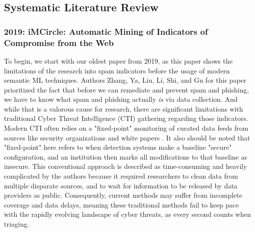 \documentclass[conference]{IEEEtran}
\begin{document}
\subsection{Systematic Literature Review}

\subsubsection{2019: iMCircle: Automatic Mining of Indicators of Compromise from the Web} %
To begin, we start with our oldest paper from 2019, as this paper shows the limitations of the research into spam indicators before the usage of modern semantic ML techniques.
Authors Zhang, Ya, Liu, Li, Shi, and Gu for this paper prioritized the fact that before we can remediate and prevent spam and phishing, we have to know what spam and phishing actually \textit{is} via data collection.
And while that is a valorous cause for research, there are significant limitations with traditional Cyber Threat Intelligence (CTI) gathering regarding those indicators.
Modern CTI often relies on a "fixed-point" monitoring of curated data feeds from sources like security organizations and white papers \cite{zhang1}.
It also should be noted that "fixed-point" here refers to when detection systems make a baseline "secure" configuration, and an institution then marks all modifications to that baseline as insecure.
This conventional approach is described as time-consuming and heavily complicated by the authors because it required researchers to clean data from multiple disparate sources, and to wait for information to be released by data providers as public.
Consequently, current methods may suffer from incomplete coverage and data delays, meaning these traditional methods fail to keep pace with the rapidly evolving landscape of cyber threats, as every second counts when triaging.
\end{document}
